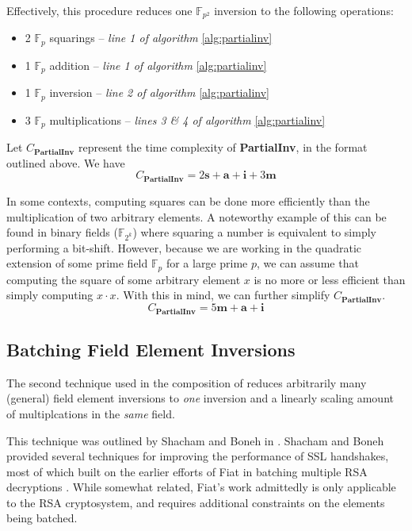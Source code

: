 Effectively, this procedure reduces one $\mathbb{F}_{p^{2}}$ inversion to the following operations:

\begin{center}
\begin{itemize}
\item 2 $\mathbb{F}_{p}$ squarings -- \emph{line 1 of algorithm} \ref{alg:partialinv}
\item 1 $\mathbb{F}_{p}$ addition -- \emph{line 1 of algorithm} \ref{alg:partialinv}
\item 1 $\mathbb{F}_{p}$ inversion -- \emph{line 2 of algorithm} \ref{alg:partialinv}
\item 3 $\mathbb{F}_{p}$ multiplications -- \emph{lines 3 \& 4 of algorithm} \ref{alg:partialinv}
\end{itemize}
\end{center}

Let $C_{\textbf{PartialInv}}$ represent the time complexity of \textbf{PartialInv}, in the format outlined above. We have
$$
C_{\textbf{PartialInv}} = 2\textbf{s} + \textbf{a} + \textbf{i} + 3\textbf{m}
$$

In some contexts, computing squares can be done more efficiently than the multiplication of two arbitrary elements. A noteworthy example of this can be found in binary fields ($\mathbb{F}_{2^k}$) where squaring a number is equivalent to simply performing a bit-shift. However, because we are working in the quadratic extension of some prime field $\mathbb{F}_p$ for a large prime $p$, we can assume that computing the square of some arbitrary element $x$ is no more or less efficient than simply computing $x \cdot x$. With this in mind, we can further simplify $C_{\textbf{PartialInv}}$.
$$
C_{\textbf{PartialInv}} = 5\textbf{m} + \textbf{a} + \textbf{i}
$$

\subsection{Batching Field Element Inversions}
\label{subsec:batching}

The second technique used in the composition of  reduces arbitrarily many (general) field element inversions to \emph{one} inversion and a linearly scaling amount of multiplcations in the \emph{same} field.

This technique was outlined by Shacham and Boneh in \cite{batching}. Shacham and Boneh provided several techniques for improving the performance of SSL handshakes, most of which built on the earlier efforts of Fiat in batching multiple RSA decryptions \cite{RSAbatch}. While somewhat related, Fiat's work admittedly is only applicable to the RSA cryptosystem, and requires additional constraints on the elements being batched.

